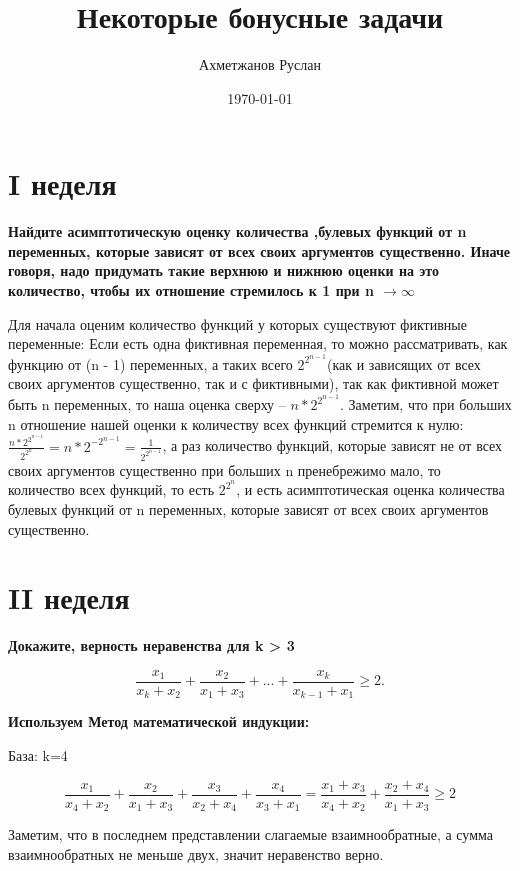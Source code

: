 \documentclass[a4paper,11pt]{article}
\author{Ахметжанов Руслан}
\title{Некоторые бонусные задачи}
\date{\today}
\begin{document}
\maketitle 


\section*{I неделя}
 \textbf{Найдите асимптотическую оценку количества ,булевых функций от n переменных, которые зависят от всех своих аргументов существенно. Иначе говоря, надо придумать такие верхнюю и нижнюю оценки на это количество, чтобы их отношение стремилось к 1 при n $ \rightarrow \infty$}
 
 	Для начала оценим количество функций у которых существуют фиктивные переменные:
 Если есть одна фиктивная переменная, то можно рассматривать, как функцию от (n - 1) переменных, а таких всего $2^{2^{n-1}}$(как и зависящих от всех своих аргументов существенно, так и с фиктивными), так как фиктивной может быть n переменных, то наша оценка сверху -- $n*2^{2^{n-1}}$. Заметим, что при больших n отношение нашей оценки к количеству всех функций стремится к нулю: $ \frac{n*2^{2^{n-1}}}{2^{2^n}} = n*2^{-2^{n-1}} = \frac{1}{2^{2^{n-1}}}$, а раз количество функций, которые зависят не от всех своих аргументов существенно при больших n пренебрежимо мало, то количество всех функций, то есть $2^{2^n}$, и есть асимптотическая оценка количества булевых функций от n переменных, которые зависят от всех своих аргументов существенно.
\section*{II неделя}
\textbf{Докажите, верность неравенства для k > 3}

\[ \frac{ x_{1}}{ x_{k} +  x_{2}} + \frac{ x_{2}}{ x_{1} +  x_{3}} +...+  \frac{ x_{k}}{ x_{k - 1} +  x_{1}} \geq 2.\]

\textbf{Используем Метод математической индукции:}

\begin{center}
	База: k=4
\end{center}

\[\frac{ x_{1}}{ x_{4} +  x_{2}} + \frac{ x_{2}}{ x_{1} +  x_{3}} + \frac{ x_{3}}{ x_{2} +  x_{4}} + \frac{ x_{4}}{ x_{3} +  x_{1}} =\frac{ x_{1} + x_{3}}{ x_{4} + x_{2}} + \frac{ x_{2} + x_{4}}{ x_{1} + x_{3}} \geq 2\]

\begin{center}
	Заметим, что в последнем представлении слагаемые взаимнообратные, а сумма взаимнообратных не меньше двух, значит неравенство верно.
\end{center}
\end{document}
